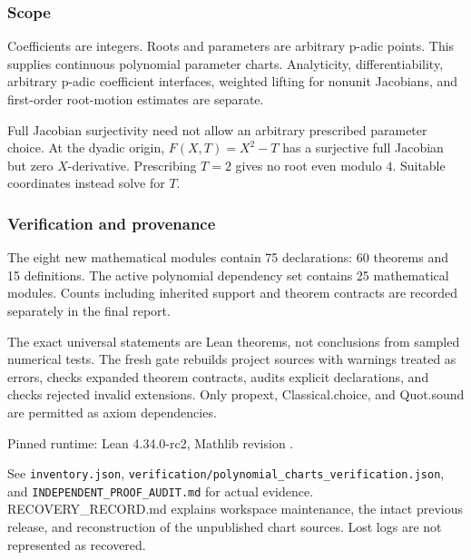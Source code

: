\hypertarget{cont5:scope}{%
\subsubsection{Scope}\label{cont5:scope}}

Coefficients are integers. Roots and parameters are arbitrary p-adic
points. This supplies continuous polynomial parameter charts.
Analyticity, differentiability, arbitrary p-adic coefficient interfaces,
weighted lifting for nonunit Jacobians, and first-order root-motion
estimates are separate.

Full Jacobian surjectivity need not allow an arbitrary prescribed
parameter choice. At the dyadic origin, \(F(X,T)=X^2-T\) has a
surjective full Jacobian but zero \(X\)-derivative. Prescribing \(T=2\)
gives no root even modulo \(4\). Suitable coordinates instead solve for
\(T\).

\hypertarget{cont5:verification-and-provenance}{%
\subsubsection{Verification and
provenance}\label{cont5:verification-and-provenance}}

The eight new mathematical modules contain 75 declarations: 60 theorems
and 15 definitions. The active polynomial dependency set contains 25
mathematical modules. Counts including inherited support and theorem
contracts are recorded separately in the final report.

The exact universal statements are Lean theorems, not conclusions from
sampled numerical tests. The fresh gate rebuilds project sources with
warnings treated as errors, checks expanded theorem contracts, audits
explicit declarations, and checks rejected invalid extensions. Only
propext, Classical.choice, and Quot.sound are permitted as axiom
dependencies.

Pinned runtime: Lean 4.34.0-rc2, Mathlib revision
.

See \nolinkurl{inventory.json}, \nolinkurl{verification/polynomial_charts_verification.json},
and \nolinkurl{INDEPENDENT_PROOF_AUDIT.md} for actual evidence.
RECOVERY\_RECORD.md explains workspace maintenance, the intact previous
release, and reconstruction of the unpublished chart sources. Lost logs
are not represented as recovered.
